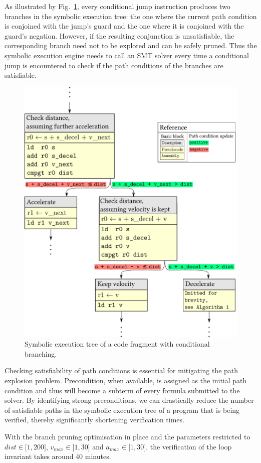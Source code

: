 As illustrated by Fig.~\ref{fig-sym-tree}, every conditional jump instruction produces
two branches in the symbolic execution tree: the one
where the current path condition is conjoined with the jump's guard and the one where it is
conjoined with the guard's negation. However, if the resulting
conjunction is unsatisfiable, the corresponding branch need not to be explored
and can be safely pruned.
Thus the symbolic execution engine needs to call an SMT solver every
time a conditional jump is encountered to check if the path conditions of the branches
are satisfiable.

\begin{figure}
\centerline{\includegraphics[scale=0.4]{fig/sym-tree.pdf}}
\caption{Symbolic execution tree of a code fragment with conditional branching.\label{fig-sym-tree}}
\end{figure}

Checking satisfiability of path conditions is essential for mitigating the path explosion
problem. Precondition, when available, is assigned as the initial path condition and thus
will become a subterm of every formula submitted to the solver.
By identifying strong preconditions, we can drastically reduce the number of
satisfiable paths in the symbolic execution tree of a program that is being
verified, thereby significantly shortening verification times.

With the branch pruning optimisation in place and the parameters restricted
to $dist \in \mathopen[1, 200\mathclose]$, $v_{max} \in \mathopen[1, 30\mathclose]$ and
$a_{max} \in \mathopen[1, 30\mathclose]$, the verification of the loop invariant
takes around 40 minutes.
